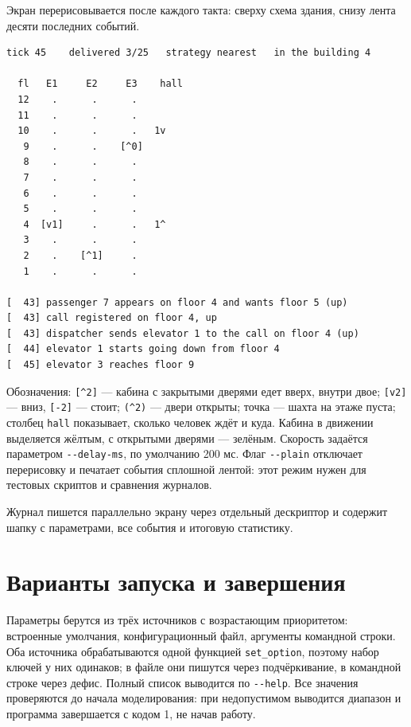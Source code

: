 \documentclass[12pt,a4paper]{article}
\begin{document}
Экран перерисовывается после каждого такта: сверху схема здания, снизу
лента десяти последних событий.

{\small
\begin{verbatim}
tick 45    delivered 3/25   strategy nearest   in the building 4

  fl   E1     E2     E3    hall
  12    .      .      .
  11    .      .      .
  10    .      .      .   1v
   9    .      .    [^0]
   8    .      .      .
   7    .      .      .
   6    .      .      .
   5    .      .      .
   4  [v1]     .      .   1^
   3    .      .      .
   2    .    [^1]     .
   1    .      .      .

[  43] passenger 7 appears on floor 4 and wants floor 5 (up)
[  43] call registered on floor 4, up
[  43] dispatcher sends elevator 1 to the call on floor 4 (up)
[  44] elevator 1 starts going down from floor 4
[  45] elevator 3 reaches floor 9
\end{verbatim}
}

Обозначения: \verb|[^2]| --- кабина с закрытыми дверями едет вверх,
внутри двое; \verb|[v2]| --- вниз, \verb|[-2]| --- стоит;
\verb|(^2)| --- двери открыты; точка --- шахта на этаже пуста; столбец
\verb|hall| показывает, сколько человек ждёт и куда. Кабина в движении
выделяется жёлтым, с открытыми дверями --- зелёным.
Скорость задаётся параметром \verb|--delay-ms|, по умолчанию 200 мс. Флаг
\verb|--plain| отключает перерисовку и печатает события сплошной лентой:
этот режим нужен для тестовых скриптов и сравнения журналов.

Журнал пишется параллельно экрану через отдельный дескриптор и содержит
шапку с параметрами, все события и итоговую статистику.

\section{Варианты запуска и завершения}

Параметры берутся из трёх источников с возрастающим приоритетом:
встроенные умолчания, конфигурационный файл, аргументы командной строки.
Оба источника обрабатываются одной функцией \verb|set_option|, поэтому
набор ключей у них одинаков; в файле они пишутся через подчёркивание, в
командной строке через дефис. Полный список выводится по \verb|--help|.
Все значения проверяются до начала моделирования: при недопустимом
выводится диапазон и программа завершается с кодом 1, не начав работу.
\end{document}
